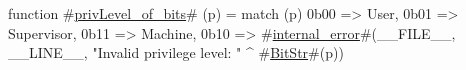 function #\hyperref[sailRISCVzprivLevelzyofzybits]{privLevel\_of\_bits}# (p) =
  match (p) {
    0b00 => User,
    0b01 => Supervisor,
    0b11 => Machine,
    0b10 => #\hyperref[sailRISCVzinternalzyerror]{internal\_error}#(__FILE__, __LINE__, "Invalid privilege level: " ^ #\hyperref[sailRISCVzBitStr]{BitStr}#(p))
  }
